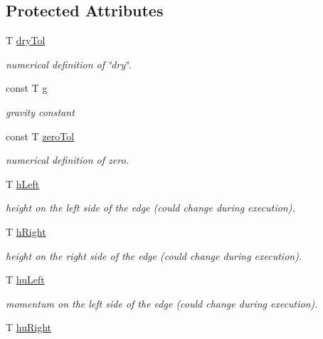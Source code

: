 \subsection*{Protected Attributes}
\begin{DoxyCompactItemize}
\item 
T \hyperlink{classsolver_1_1WavePropagation_a4a05c4bd71fdd1f8934ae5faddcea080}{dry\+Tol}
\begin{DoxyCompactList}\small\item\em numerical definition of \char`\"{}dry\char`\"{}. \end{DoxyCompactList}\item 
const T \hyperlink{classsolver_1_1WavePropagation_a5364825d416254d67103f1969ad2e273}{g}
\begin{DoxyCompactList}\small\item\em gravity constant \end{DoxyCompactList}\item 
const T \hyperlink{classsolver_1_1WavePropagation_ad49670e8fd53ef1ace084b618a0d9a02}{zero\+Tol}
\begin{DoxyCompactList}\small\item\em numerical definition of zero. \end{DoxyCompactList}\item 
T \hyperlink{classsolver_1_1WavePropagation_ae44e91bee496fad2170039ccdbb98743}{h\+Left}
\begin{DoxyCompactList}\small\item\em height on the left side of the edge (could change during execution). \end{DoxyCompactList}\item 
T \hyperlink{classsolver_1_1WavePropagation_a6269e7a67be3c63ceaca5a4030f921ec}{h\+Right}
\begin{DoxyCompactList}\small\item\em height on the right side of the edge (could change during execution). \end{DoxyCompactList}\item 
T \hyperlink{classsolver_1_1WavePropagation_a60c0a3d59b4e6225865f0442afbaa75d}{hu\+Left}
\begin{DoxyCompactList}\small\item\em momentum on the left side of the edge (could change during execution). \end{DoxyCompactList}\item 
T \hyperlink{classsolver_1_1WavePropagation_a511d65348b55c407e9ca909acadad555}{hu\+Right}

\end{DoxyCompactItemize}

